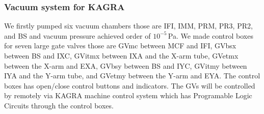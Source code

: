 \vspace{10pt}
\subsubsection*{\bf Vacuum system for KAGRA}
\vspace{3pt}

\vspace{3pt}

We firstly pumped six vacuum chambers those are IFI, IMM, PRM, PR3, PR2, and BS and vacuum pressure achieved order of $10^{-5}$\,Pa. We made control boxes for seven large gate valves those are GVmc between MCF and IFI, GVbsx between BS and IXC, GVitmx between IXA and the X-arm tube, GVetmx between the X-arm and EXA, GVbsy between BS and IYC, GVitmy between IYA and the Y-arm tube, and GVetmy between the Y-arm and EYA. The control boxes has open/close control buttons and indicators. The GVs will be controlled by remotely via KAGRA machine control system which has Programable Logic Circuits through the control boxes.

%
%
%
%
%
